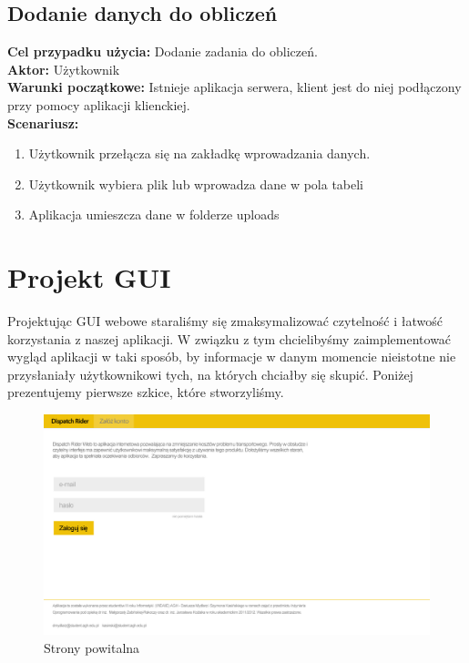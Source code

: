 \subsection{Dodanie danych do obliczeń}
	\textbf{Cel przypadku użycia:} Dodanie zadania do obliczeń.\\
	\textbf{Aktor:} Użytkownik\\
	\textbf{Warunki początkowe:} Istnieje aplikacja serwera, klient jest do niej podłączony przy pomocy aplikacji klienckiej.\\
	\textbf{Scenariusz:}
	\begin{enumerate}
	\item Użytkownik przełącza się na zakładkę wprowadzania danych.
	\item Użytkownik wybiera plik lub wprowadza dane w pola tabeli
	\item Aplikacja umieszcza dane w folderze uploads\\
	\end{enumerate}

\vfill\hfill
\newpage

\section{Projekt GUI}
Projektując GUI webowe staraliśmy się zmaksymalizować czytelność i łatwość korzystania z naszej aplikacji. W związku z tym chcielibyśmy zaimplementować wygląd aplikacji w taki sposób, by informacje w danym momencie nieistotne nie przysłaniały użytkownikowi tych, na których chciałby się skupić. Poniżej prezentujemy pierwsze szkice, które stworzyliśmy. 
\begin{center}
\begin{figure}[H]
\centering
\includegraphics[scale=0.3]{imgs/unlogged_home.jpg}
\caption{Strony powitalna}
\label{fig:home_page}
\end{figure}
\end{center}

